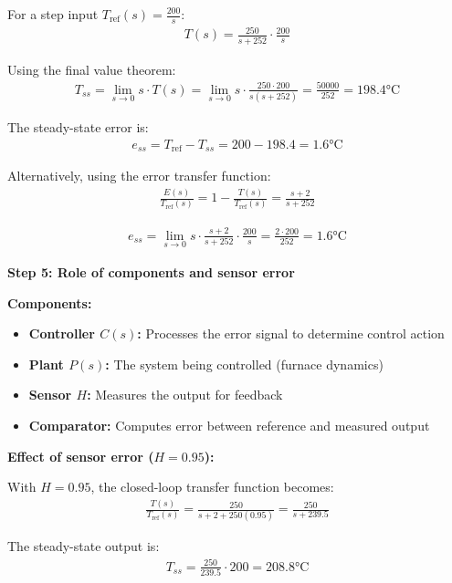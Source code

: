 \documentclass[11pt,a4paper]{article}
\begin{document}
For a step input $T_{\text{ref}}(s) = \frac{200}{s}$:
\begin{align}
  T(s) = \frac{250}{s+252} \cdot \frac{200}{s}
\end{align}

Using the final value theorem:
\begin{align}
  T_{ss} = \lim_{s \to 0} s \cdot T(s) = \lim_{s \to 0} s \cdot \frac{250 \cdot 200}{s(s+252)} = \frac{50000}{252} = 198.4 \text{°C}
\end{align}

The steady-state error is:
\begin{align}
  e_{ss} = T_{\text{ref}} - T_{ss} = 200 - 198.4 = 1.6 \text{°C}
\end{align}

Alternatively, using the error transfer function:
\begin{align}
  \frac{E(s)}{T_{\text{ref}}(s)} = 1 - \frac{T(s)}{T_{\text{ref}}(s)} = \frac{s+2}{s+252}
\end{align}

\begin{align}
  e_{ss} = \lim_{s \to 0} s \cdot \frac{s+2}{s+252} \cdot \frac{200}{s} = \frac{2 \cdot 200}{252} = 1.6 \text{°C}
\end{align}

\textbf{Step 5: Role of components and sensor error}

\textbf{Components:}
\begin{itemize}
  \item \textbf{Controller $C(s)$:} Processes the error signal to determine control action
  \item \textbf{Plant $P(s)$:} The system being controlled (furnace dynamics)
  \item \textbf{Sensor $H$:} Measures the output for feedback
  \item \textbf{Comparator:} Computes error between reference and measured output
\end{itemize}

\textbf{Effect of sensor error ($H = 0.95$):}

With $H = 0.95$, the closed-loop transfer function becomes:
\begin{align}
  \frac{T(s)}{T_{\text{ref}}(s)} = \frac{250}{s + 2 + 250(0.95)} = \frac{250}{s + 239.5}
\end{align}

The steady-state output is:
\begin{align}
  T_{ss} = \frac{250}{239.5} \cdot 200 = 208.8 \text{°C}
\end{align}
\end{document}
